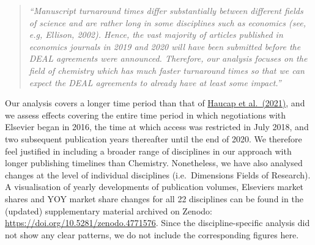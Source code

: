 \documentclass[
]{article}
\begin{document}
\begin{quote}
\emph{``Manuscript turnaround times differ substantially between different fields of science and are rather long in some disciplines such as economics (see, e.g, Ellison, 2002). Hence, the vast majority of articles published in economics journals in 2019 and 2020 will have been submitted before the DEAL agreements were announced. Therefore, our analysis focuses on the field of chemistry which has much faster turnaround times so that we can expect the DEAL agreements to already have at least some impact.''}
\end{quote}

Our analysis covers a longer time period than that of \href{https://www.cesifo.org/en/publikationen/2021/working-paper/impact-german-deal-competition-academic-publishing-market}{Haucap et al.~(2021)}, and we assess effects covering the entire time period in which negotiations with Elsevier began in 2016, the time at which access was restricted in July 2018, and two subsequent publication years thereafter until the end of 2020. We therefore feel justified in including a broader range of disciplines in our approach with longer publishing timelines than Chemistry. Nonetheless, we have also analysed changes at the level of individual disciplines (i.e.~Dimensions Fields of Research). A visualisation of yearly developments of publication volumes, Elsevier\textquotesingle s market shares and YOY market share changes for all 22 disciplines can be found in the (updated) supplementary material archived on Zenodo: \url{https://doi.org/10.5281/zenodo.4771576}. Since the discipline-specific analysis did not show any clear patterns, we do not include the corresponding figures here.
\end{document}
